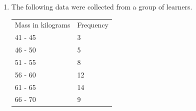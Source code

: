 \begin{description}[noitemsep]
\begin{description}[noitemsep]
\begin{enumerate}[noitemsep, label=\textbf{\arabic*}. ]
\begin{table}[H]
\begin{center}
\begin{xtabular}[t]{|l|l|}
     \tabularnewline{}
    \end{xtabular}
      \end{center}
    \begin{center}{\small\bfseries Table 16.16}\end{center}
    \begin{caption}{\small\bfseries Table 16.16}\end{caption}
\end{table}
    \par
          \label{m39400*uid104}\item The following data were collected from a group of learners.
          \begin{table}[H]
        \begin{center}
      \label{m39400*id215730}
    \noindent
      \tablelasttail{}
      \begin{xtabular}[t]{|l|l|}\hline
        Mass in kilograms &
        Frequency%
     \tabularnewline{}
        41 - 45 &
        3%
     \tabularnewline{}
        46 - 50 &
        5%
     \tabularnewline{}
        51 - 55 &
        8%
     \tabularnewline{}
        56 - 60 &
        12%
     \tabularnewline{}
        61 - 65 &
        14%
     \tabularnewline{}
        66 - 70 &
        9%
     \tabularnewline{}

\end{xtabular}
\end{center}
\end{table}
\end{enumerate}
\end{description}
\end{description}
